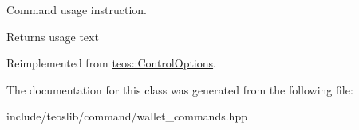 Command \textquotesingle{}usage\textquotesingle{} instruction. 

\begin{DoxyReturn}{Returns}
usage text 
\end{DoxyReturn}


Reimplemented from \mbox{\hyperlink{classteos_1_1_control_options_a0aa5671f9bc750ed5280c26c543874f3}{teos\+::\+Control\+Options}}.



The documentation for this class was generated from the following file\+:\begin{DoxyCompactItemize}
\item 
include/teoslib/command/wallet\+\_\+commands.\+hpp\end{DoxyCompactItemize}
